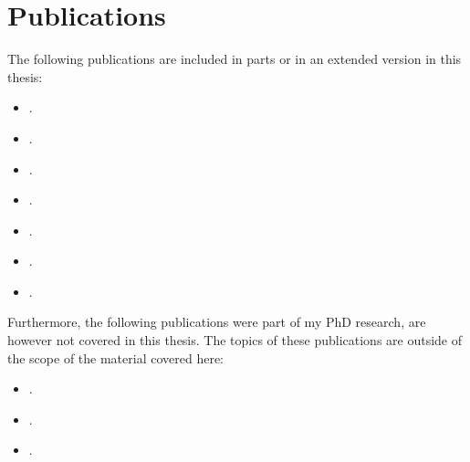 \chapter*{Publications}

The following publications are included in parts or in an extended version in
this thesis:
\begin{itemize}
    \item {}.
    \item {}.
    \item {}.
    \item {}.
    \item {}.
    \item {}.
    \item {}.
\end{itemize}

Furthermore, the following publications were part of my PhD research, are
however not covered in this thesis. The topics of these publications are
outside of the scope of the material covered here:
\begin{itemize}
    \item {}.
    \item {}.
    \item {}.
\end{itemize}

